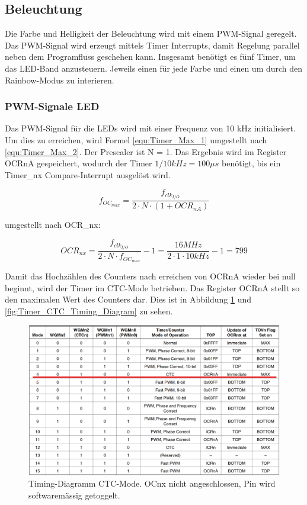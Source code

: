 \subsection{Beleuchtung}
\label{subsec:Inbetriebnahme_Beleuchtung}

Die Farbe und Helligkeit der Beleuchtung wird mit einem PWM-Signal geregelt. Das PWM-Signal wird erzeugt mittels Timer Interrupts, damit Regelung parallel neben dem Programfluss geschehen kann. Insgesamt benötigt es fünf Timer, um das LED-Band anzusteuern. Jeweils einen für jede Farbe und einen um durch den Rainbow-Modus zu interieren.

\subsubsection{PWM-Signale LED}

Das PWM-Signal für die LEDs wird mit einer Frequenz von 10 kHz initialisiert. Um dies zu erreichen, wird Formel \ref{equ:Timer_Max_1} umgestellt nach \ref{equ:Timer_Max_2}. Der Prescaler ist N = 1. Das Ergebnis wird im Register OCRnA gespeichert, wodurch der Timer $1/10kHz = 100\mu s$ benötigt, bis ein Timer\_nx Compare-Interrupt ausgelöst wird.

\begin{equation}
f_{OC_{max}} = \frac{f_{clk_{I/O}}}{2 \cdot N \cdot (1+OCR_{nA})}
\label{equ:Timer_Max_1}
\end{equation}

umgestellt nach OCR\_nx:

\begin{equation}
OCR_{nx} = \frac{f_{clk_{I/O}}}{2 \cdot N \cdot f_{OC_{max}}} - 1 = \frac{16MHz}{2 \cdot 1 \cdot 10kHz} - 1 = 799
\label{equ:Timer_Max_2}
\end{equation}

Damit das Hochzählen des Counters nach erreichen von OCRnA wieder bei null beginnt, wird der Timer im CTC-Mode betrieben. Das Register OCRnA stellt so den maximalen Wert des Counters dar. Dies ist in Abbildung \ref {fig:Timer_CTC_Mode} und \ref{fig:Timer_CTC_Timing_Diagram} zu sehen.

\begin{figure}[h!]
	\centering
	\includegraphics[width=\textwidth]{graphics/Timer_CTC_Mode}
	\caption{Timing-Diagramm CTC-Mode. OCnx nicht angeschlossen, Pin wird softwaremässig getoggelt.}
	\label{fig:Timer_CTC_Mode}
\end{figure}


